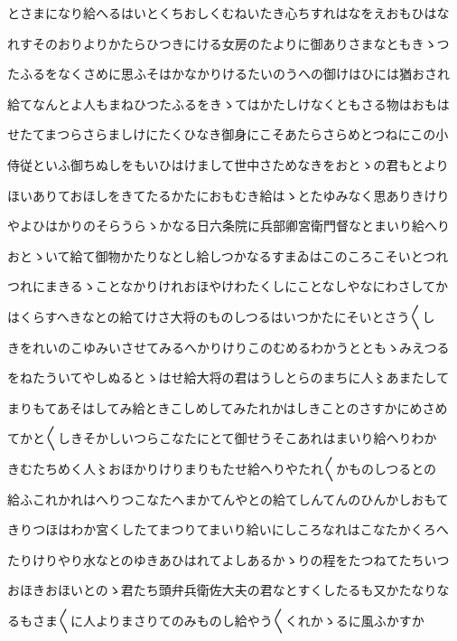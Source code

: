 \documentclass[a4paper,11pt,landscape]{ltjtarticle}
\begin{document}
\par\medskip
とさまになり給へるはいとくちおしくむねいたき心ちすれはなをえおもひはな
\par\medskip
れすそのおりよりかたらひつきにける女房のたよりに御ありさまなともきゝつ
\par\medskip
たふるをなくさめに思ふそはかなかりけるたいのうへの御けはひには猶おされ
\par\medskip
給てなんとよ人もまねひつたふるをきゝてはかたしけなくともさる物はおもは
\par\medskip
せたてまつらさらましけにたくひなき御身にこそあたらさらめとつねにこの小
\par\medskip
侍従といふ御ちぬしをもいひはけまして世中さためなきをおとゝの君もとより
\par\medskip
ほいありておほしをきてたるかたにおもむき給はゝとたゆみなく思ありきけり
\par\medskip
やよひはかりのそらうらゝかなる日六条院に兵部卿宮衛門督なとまいり給へり
\par\medskip
おとゝいて給て御物かたりなとし給しつかなるすまゐはこのころこそいとつれ
\par\medskip
つれにまきるゝことなかりけれおほやけわたくしにことなしやなにわさしてか
\par\medskip
はくらすへきなとの給てけさ大将のものしつるはいつかたにそいとさう〱し
\par\medskip
きをれいのこゆみいさせてみるへかりけりこのむめるわかうとともゝみえつる
\par\medskip
をねたういてやしぬるとゝはせ給大将の君はうしとらのまちに人〻あまたして
\par\medskip
まりもてあそはしてみ給ときこしめしてみたれかはしきことのさすかにめさめ
\par\medskip
てかと〱しきそかしいつらこなたにとて御せうそこあれはまいり給へりわか
\par\medskip
きむたちめく人〻おほかりけりまりもたせ給へりやたれ〱かものしつるとの
\par\medskip
給ふこれかれはへりつこなたへまかてんやとの給てしんてんのひんかしおもて
\par\medskip
きりつほはわか宮くしたてまつりてまいり給いにしころなれはこなたかくろへ
\par\medskip
たりけりやり水なとのゆきあひはれてよしあるかゝりの程をたつねてたちいつ
\par\medskip
おほきおほいとのゝ君たち頭弁兵衛佐大夫の君なとすくしたるも又かたなりな
\par\medskip
るもさま〱に人よりまさりてのみものし給やう〱くれかゝるに風ふかすか
\par\medskip
\end{document}
